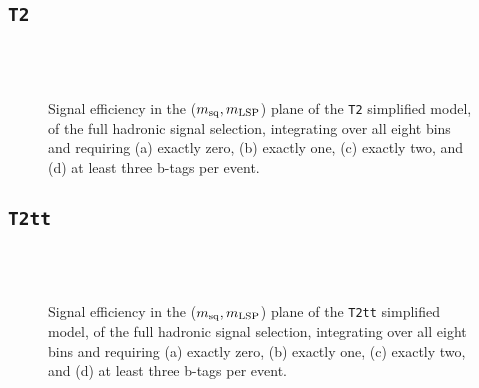 \newpage
\subsection{\texttt{T2}\label{app:sig-eff-t2}}

\begin{figure}[h!]
  \begin{center}
     \\
     \\
    \caption{\label{fig:sig-eff-t2}Signal efficiency in the ($m_{\rm
        sq},m_{\rm LSP}$) plane of the \texttt{T2} simplified model,
      of the full hadronic signal selection, integrating over all
      eight \HT bins and requiring (a) exactly zero, (b) exactly
      one, (c) exactly two, and (d) at least three b-tags per event.}
  \end{center}
\end{figure}

\newpage
\subsection{\texttt{T2tt}\label{app:sig-eff-t2tt}}

\begin{figure}[h!]
  \begin{center}
     \\
     \\
    \caption{\label{fig:sig-eff-t2tt}Signal efficiency in the ($m_{\rm
        sq},m_{\rm LSP}$) plane of the \texttt{T2tt} simplified model,
      of the full hadronic signal selection, integrating over all
      eight \HT bins and requiring (a) exactly zero, (b) exactly
      one, (c) exactly two, and (d) at least three b-tags per event.}
  \end{center}
\end{figure}


